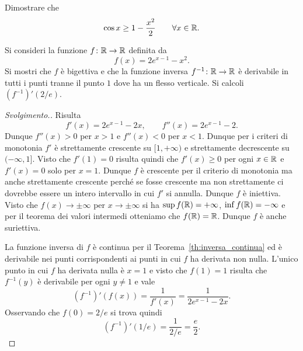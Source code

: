 \begin{exercise}
Dimostrare che
\[
  \cos x \ge 1- \frac{x^2}{2} \qquad \forall x \in \mathbb R.
\]
\end{exercise}

\begin{exercise}
Si consideri la funzione $f\colon \mathbb R \to \mathbb R$ definita da
\[
  f(x) = 2e^{x-1} - x^2.
\]
Si mostri che $f$ è bigettiva e
che la funzione inversa $f^{-1}\colon \mathbb R \to \mathbb R$ è derivabile in
tutti i punti tranne il punto $1$ dove ha un flesso verticale.
Si calcoli $(f^{-1})'(2/e)$.
\end{exercise}
\begin{proof}[Svolgimento.]
Risulta
\[
  f'(x) = 2e^{x-1} - 2x, \qquad f''(x) = 2e^{x-1}-2.
\]
Dunque $f''(x) > 0$ per $x > 1$ e $f''(x)< 0$ per $x<1$.
Dunque per i criteri di monotonia
$f'$ è strettamente crescente su $[1,+\infty)$ e strettamente
decrescente su $(-\infty, 1]$. Visto che $f'(1)=0$ risulta quindi che
$f'(x)\ge 0$ per ogni $x\in \mathbb R$ e $f'(x)=0$ solo per $x=1$.
Dunque $f$ è crescente per il criterio di monotonia ma anche
strettamente crescente perché se fosse crescente ma non strettamente
ci dovrebbe essere un intero intervallo in cui $f'$ si annulla.
Dunque $f$ è iniettiva. Visto che $f(x)\to \pm\infty$ per $x\to \pm\infty$
si ha $\sup f(\mathbb R) = +\infty$, $\inf f(\mathbb R) = -\infty$ e per il teorema dei valori intermedi
otteniamo che $f(\mathbb R)=\mathbb R$. Dunque $f$ è anche suriettiva.

La funzione inversa di $f$ è continua per il Teorema~\ref{th:inversa_continua}
ed è derivabile nei punti corrispondenti ai punti in cui $f$ ha derivata non nulla.
L'unico punto in cui $f$ ha derivata nulla è $x=1$ e visto che $f(1) = 1$ risulta
che $f^{-1}(y)$ è derivabile per ogni $y\neq 1$ e vale
\[
  (f^{-1})'(f(x)) = \frac{1}{f'(x)} = \frac{1}{2 e^{x-1}-2x}.
\]
Osservando che $f(0)=2/e$ si trova quindi
\[
  (f^{-1})'(1/e) = \frac{1}{2/e} = \frac e 2.
\]
\end{proof}


